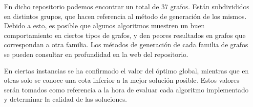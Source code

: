 En dicho repositorio podemos encontrar un total de 37 grafos. Están subdivididos en distintos grupos,
que hacen referencia al método de generación de los mismos. Debido a esto, es posible que algunos
algoritmos muestren un buen comportamiento en ciertos tipos de grafos, y den peores resultados en
grafos que correspondan a otra familia. Los métodos de generación de cada familia de grafos se pueden
consultar en profundidad en la web del repositorio.

En ciertas instancias se ha confirmado el valor del óptimo global, mientras que en otras solo se conoce
una cota inferior a la mejor solución posible. Estos valores serán tomados como referencia a la hora
de evaluar cada algoritmo implementado y determinar la calidad de las soluciones.
